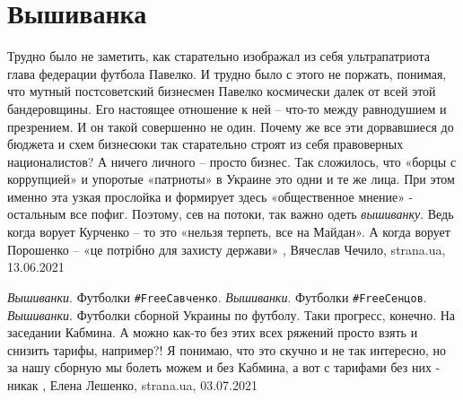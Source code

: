  
 
 
 
 
\chapter{Вышиванка}
\label{sec:slova.vyshyvanka}

Трудно было не заметить, как старательно изображал из себя ультрапатриота глава
федерации футбола Павелко. И трудно было с этого не поржать, понимая, что
мутный постсоветский бизнесмен Павелко космически далек от всей этой
бандеровщины. Его настоящее отношение к ней – что-то между равнодушием и
презрением.  И он такой совершенно не один. Почему же все эти дорвавшиеся до
бюджета и схем бизнесюки так старательно строят из себя правоверных
националистов? А ничего личного – просто бизнес. Так сложилось, что «борцы с
коррупцией» и упоротые «патриоты» в Украине это одни и те же лица. При этом
именно эта узкая прослойка и формирует здесь «общественное мнение» - остальным
все пофиг.  Поэтому, сев на потоки, так важно одеть \emph{вышиванку}. Ведь когда
ворует Курченко – то это «нельзя терпеть, все на Майдан». А когда ворует
Порошенко – «це потрібно для захисту держави»
,
Вячеслав Чечило, strana.ua, 13.06.2021



\emph{Вышиванки}. Футболки \verb|#FreeСавченко|. \emph{Вышиванки}. Футболки
\verb|#FreeСенцов|.  \emph{Вышиванки}. Футболки сборной Украины по футболу.  Таки
прогресс, конечно.  На заседании Кабмина.  А можно как-то без этих всех ряжений
просто взять и снизить тарифы, например?!  Я понимаю, что это скучно и не так
интересно, но за нашу сборную мы болеть можем и без Кабмина, а вот с тарифами
без них - никак
, 
Елена Лешенко, strana.ua, 03.07.2021
